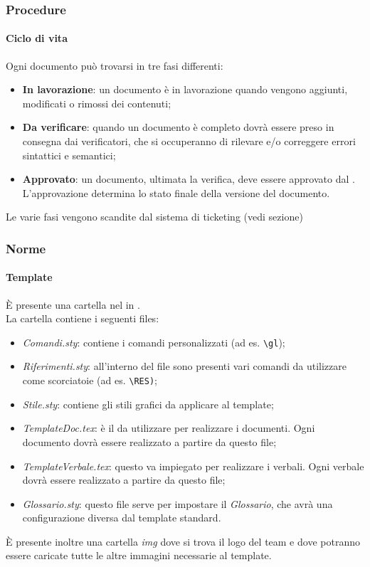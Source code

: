 \subsubsection{Procedure}
	\paragraph{Ciclo di vita}
	Ogni documento può trovarsi in tre fasi differenti:
	\begin{itemize}
		\item \textbf{In lavorazione}: un documento è in lavorazione quando vengono aggiunti, modificati o rimossi dei contenuti;
		\item \textbf{Da verificare}: quando un documento è completo dovrà essere preso in consegna dai verificatori, che si occuperanno di rilevare e/o correggere errori sintattici e semantici;
		\item \textbf{Approvato}: un documento, ultimata la verifica, deve essere approvato dal \RES. L'approvazione determina lo stato finale della versione del documento.
	\end{itemize}
	Le varie fasi vengono scandite dal sistema di ticketing (vedi sezione) %
\subsubsection{Norme}
	\paragraph{Template}
	È presente una cartella nel  in . \\
	La cartella contiene i seguenti files:
	\begin{itemize}
		\item \textit{Comandi.sty}: contiene i comandi personalizzati (ad es. \texttt {\textbackslash gl});
		\item \textit{Riferimenti.sty}: all'interno del file sono presenti vari comandi da utilizzare come scorciatoie (ad es. \texttt{\textbackslash RES)};
		\item \textit{Stile.sty}: contiene gli stili grafici da applicare al template;
		\item \textit{TemplateDoc.tex}: è il  da utilizzare per realizzare i documenti. Ogni documento dovrà essere realizzato a partire da questo file;
		\item \textit{TemplateVerbale.tex}: questo  va impiegato per realizzare i verbali. Ogni verbale dovrà essere realizzato a partire da questo file;
		\item \textit{Glossario.sty}: questo file serve per impostare il \textit{Glossario}, che avrà una configurazione diversa dal template standard. %
	\end{itemize}
	È presente inoltre una cartella \textit{img} dove si trova il logo del team e dove potranno essere caricate tutte le altre immagini necessarie al template. 
